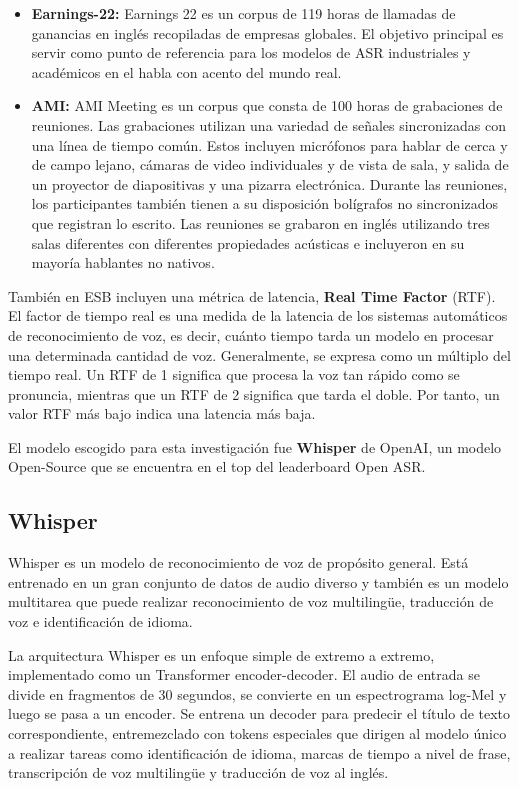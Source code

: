 \documentclass[conference]{IEEEtran}
\begin{document}
\begin{itemize}
    \item \textbf{Earnings-22:} Earnings 22 \cite{delrio2022earnings22} es un corpus de 119 horas de llamadas de ganancias en inglés recopiladas de empresas globales. El objetivo principal es servir como punto de referencia para los modelos de ASR industriales y académicos en el habla con acento del mundo real.
    \item \textbf{AMI:} AMI Meeting \cite{Platen_2019} es un corpus que consta de 100 horas de grabaciones de reuniones. Las grabaciones utilizan una variedad de señales sincronizadas con una línea de tiempo común. Estos incluyen micrófonos para hablar de cerca y de campo lejano, cámaras de video individuales y de vista de sala, y salida de un proyector de diapositivas y una pizarra electrónica. Durante las reuniones, los participantes también tienen a su disposición bolígrafos no sincronizados que registran lo escrito. Las reuniones se grabaron en inglés utilizando tres salas diferentes con diferentes propiedades acústicas e incluyeron en su mayoría hablantes no nativos.
\end{itemize}

También en ESB incluyen una métrica de latencia, \textbf{Real Time Factor} (RTF). El factor de tiempo real es una medida de la latencia de los sistemas automáticos de reconocimiento de voz, es decir, cuánto tiempo tarda un modelo en procesar una determinada cantidad de voz. Generalmente, se expresa como un múltiplo del tiempo real. Un RTF de 1 significa que procesa la voz tan rápido como se pronuncia, mientras que un RTF de 2 significa que tarda el doble. Por tanto, un valor RTF más bajo indica una latencia más baja.

El modelo escogido para esta investigación fue \textbf{Whisper} de OpenAI, un modelo Open-Source que se encuentra en el top del leaderboard Open ASR.

\subsection{Whisper}
Whisper \cite{radford2022robust}  es un modelo de reconocimiento de voz de propósito general. Está entrenado en un gran conjunto de datos de audio diverso y también es un modelo multitarea que puede realizar reconocimiento de voz multilingüe, traducción de voz e identificación de idioma.

La arquitectura Whisper es un enfoque simple de extremo a extremo, implementado como un Transformer encoder-decoder. El audio de entrada se divide en fragmentos de 30 segundos, se convierte en un espectrograma log-Mel y luego se pasa a un encoder. Se entrena un decoder para predecir el título de texto correspondiente, entremezclado con tokens especiales que dirigen al modelo único a realizar tareas como identificación de idioma, marcas de tiempo a nivel de frase, transcripción de voz multilingüe y traducción de voz al inglés.
\end{document}
